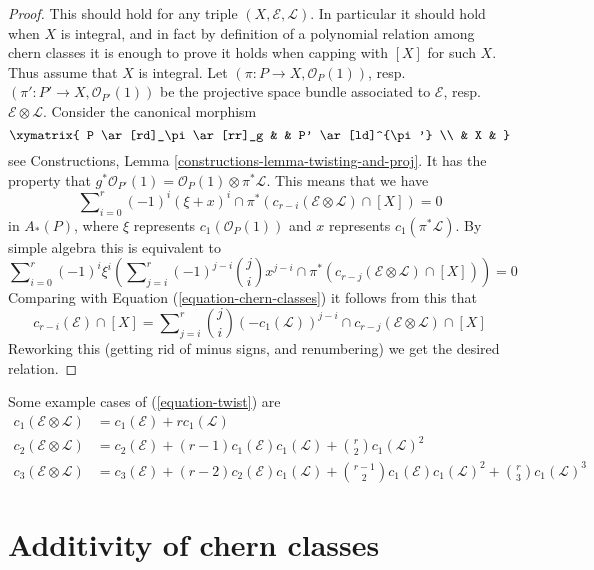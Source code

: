 \begin{proof}
This should hold for any triple $(X, \mathcal{E}, \mathcal{L})$.
In particular it should hold when $X$ is integral, and in fact by
definition of a polynomial relation among chern classes it is enough to prove
it holds when capping with $[X]$ for such $X$. Thus assume
that $X$ is integral. Let $(\pi : P \to X, \mathcal{O}_P(1))$,
resp.\ $(\pi' : P' \to X, \mathcal{O}_{P'}(1))$ be the
projective space bundle associated to $\mathcal{E}$,
resp.\ $\mathcal{E} \otimes \mathcal{L}$. Consider the canonical morphism
$$
\xymatrix{
P \ar[rd]_\pi \ar[rr]_g & & P' \ar[ld]^{\pi'} \\
& X &
}
$$
see Constructions, Lemma \ref{constructions-lemma-twisting-and-proj}.
It has the property that
$g^*\mathcal{O}_{P'}(1)
= \mathcal{O}_P(1) \otimes \pi^* {\mathcal L}$.
This means that we have
$$
\sum\nolimits_{i = 0}^r
(-1)^i
(\xi + x)^i \cap \pi^*(c_{r - i}(\mathcal{E} \otimes \mathcal{L}) \cap [X])
=
0
$$
in $A_*(P)$, where $\xi$ represents
$c_1(\mathcal{O}_P(1))$ and $x$
represents $c_1(\pi^*\mathcal{L})$. By simple algebra this
is equivalent to
$$
\sum\nolimits_{i = 0}^r
(-1)^i \xi^i \left(
\sum\nolimits_{j = i}^r
(-1)^{j - i}
\binom{j}{i}
x^{j - i} \cap
\pi^*(c_{r - j}(\mathcal{E} \otimes \mathcal{L}) \cap [X])
\right)
=
0
$$
Comparing with
Equation (\ref{equation-chern-classes}) it follows from this that
$$
c_{r - i}(\mathcal{E}) \cap [X] =
\sum\nolimits_{j = i}^r
\binom{j}{i}
(-c_1(\mathcal{L}))^{j - i} \cap
c_{r - j}(\mathcal{E} \otimes \mathcal{L}) \cap [X]
$$
Reworking this (getting rid of minus signs, and renumbering) we get
the desired relation.
\end{proof}

\noindent
Some example cases of (\ref{equation-twist}) are
\begin{align*}
c_1(\mathcal{E} \otimes \mathcal{L})
& =
c_1(\mathcal{E}) +
r c_1(\mathcal{L}) \\
c_2(\mathcal{E} \otimes \mathcal{L})
& =
c_2(\mathcal{E}) +
(r - 1) c_1(\mathcal{E}) c_1(\mathcal{L}) +
\binom{r}{2} c_1(\mathcal{L})^2 \\
c_3(\mathcal{E} \otimes \mathcal{L})
& =
c_3(\mathcal{E}) +
(r - 2) c_2(\mathcal{E})c_1(\mathcal{L}) +
\binom{r - 1}{2} c_1(\mathcal{E})c_1(\mathcal{L})^2 +
\binom{r}{3} c_1(\mathcal{L})^3
\end{align*}








\section{Additivity of chern classes}
\label{section-additivity-chern-classes}

